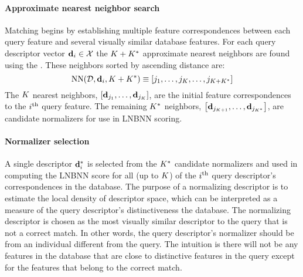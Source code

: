         \paragraph{Approximate nearest neighbor search}

            Matching begins by establishing multiple feature correspondences between each query feature and several
            visually similar database features. For each query descriptor vector $\mathbf{d}_i \in \mathcal{X}$ the $K + K^{*}$
            approximate nearest neighbors are found using the . These neighbors
            sorted by ascending distance are:
            \begin{equation}
                \operatorname{NN}(\mathcal{D}, \mathbf{d}_i, K + K^{*}) \equiv \left[j_1{}, \ldots{}, j_{K}, \ldots, j_{K + K^{*}}\right]
            \end{equation}
            The $K$ nearest neighbors, $\left[\mathbf{d}_{{j_1}}, \ldots{}, \mathbf{d}_{{j_{K}}}\right]$, are the initial feature correspondences
            to the $i^{\textrm{th}}{}$ query feature. The remaining $K^{*}$ neighbors,%
            $\left[\mathbf{d}_{{j_{K + 1}}}, \ldots{}, \mathbf{d}_{j_{K^{*}}}\right]$, are candidate normalizers for use in LNBNN scoring.

        \paragraph{Normalizer selection}
            A single descriptor $\mathbf{d}^{*}_{i}$ is selected from the $K^{*}{}$ candidate normalizers and used in
            computing the LNBNN score for all (up to $K$) of the $i^{\textrm{th}}{}$ query descriptor's correspondences in
            the database. The purpose of a normalizing descriptor is to estimate the local density of descriptor
            space, which can be interpreted as a measure of the query descriptor's distinctiveness \wrt{} the
            database. The normalizing descriptor is chosen as the most visually similar descriptor to the query
            that is not a correct match. In other words, the query descriptor's normalizer should be from an
            individual different from the query. The intuition is there will not be any features in the database
            that are close to distinctive features in the query except for the features that belong to the correct
            match.

